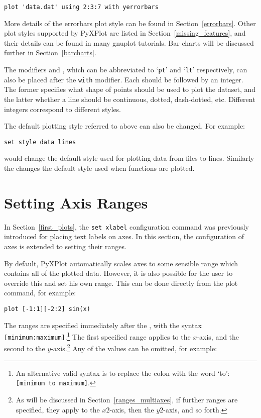 \begin{verbatim}
plot 'data.dat' using 2:3:7 with yerrorbars
\end{verbatim}

More details of the errorbars plot style can be found in
Section~\ref{errorbars}. Other plot styles supported by PyXPlot are listed in
Section~\ref{missing_features}, and their details can be found in many gnuplot
tutorials. Bar charts will be discussed further in Section~\ref{barcharts}.

The modifiers  and , which can be
abbreviated to `{\tt pt}' and `{\tt lt}' respectively, can also be placed
after the {\tt with} modifier. Each should be followed by an integer.  The
former specifies what shape of points should be used to plot the dataset, and
the latter whether a line should be continuous, dotted, dash-dotted, etc.
Different integers correspond to different styles.

The default plotting style referred to above can also be changed.  For example:

\begin{verbatim}
set style data lines
\end{verbatim}

\noindent would change the default style used for plotting data from files to
lines.  Similarly the  changes the default style
used when functions are plotted.

\section{Setting Axis Ranges}

In Section~\ref{first_plots}, the {\tt set xlabel} configuration command was
previously introduced for placing text labels on axes. In this section, the
configuration of axes is extended to setting their ranges.

By default, PyXPlot automatically scales axes to some sensible range which
contains all of the plotted data. However, it is also possible for the user to
override this and set his own range. This can be
done directly from the plot command, for example:

\begin{verbatim}
plot [-1:1][-2:2] sin(x)
\end{verbatim}
\label{plot_ranges}

\noindent The ranges are specified immediately after the , with
the syntax {\tt [minimum:maximum]}.\footnote{An alternative valid syntax is to
replace the colon with the word `to': {\tt [minimum to maximum]}.} The first
specified range applies to the $x$-axis, and the second to the
$y$-axis.\footnote{As will be discussed in Section~\ref{ranges_multiaxes}, if
further ranges are specified, they apply to the $x2$-axis, then the $y2$-axis,
and so forth.} Any of the values can be omitted, for example:

